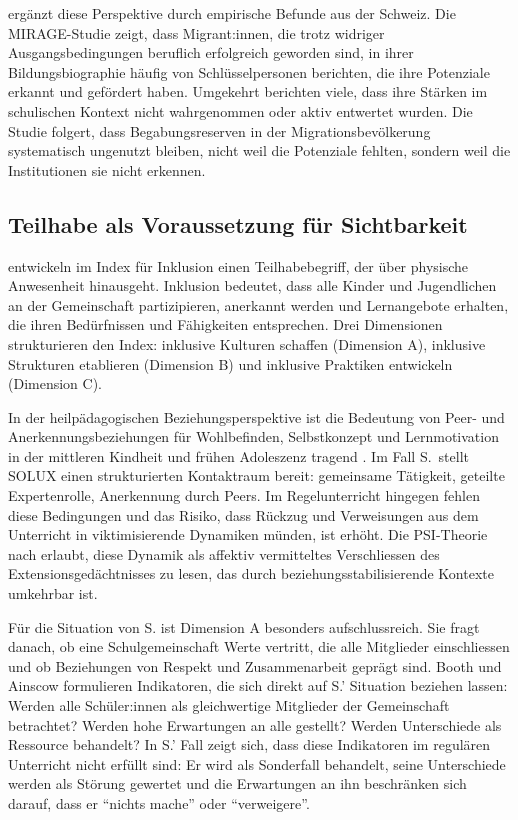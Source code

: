 \documentclass[ngerman, a4paper]{article}
\begin{document}
\textcite{stamm2014mirage} ergänzt diese Perspektive durch empirische Befunde aus der Schweiz. Die
MIRAGE-Studie zeigt, dass Migrant:innen, die trotz widriger Ausgangsbedingungen
beruflich erfolgreich geworden sind, in ihrer Bildungsbiographie häufig von
Schlüsselpersonen berichten, die ihre Potenziale erkannt und gefördert haben. Umgekehrt
berichten viele, dass ihre Stärken im schulischen Kontext nicht wahrgenommen
oder aktiv entwertet wurden. Die Studie folgert, dass Begabungsreserven in der
Migrationsbevölkerung systematisch ungenutzt bleiben, nicht weil die Potenziale
fehlten, sondern weil die Institutionen sie nicht erkennen.

\subsection{Teilhabe als Voraussetzung für Sichtbarkeit}

\textcite[Dim.\,A--C]{booth2019index} entwickeln im Index für Inklusion einen Teilhabebegriff, der über
physische Anwesenheit hinausgeht. Inklusion bedeutet, dass alle Kinder und Jugendlichen
an der Gemeinschaft partizipieren, anerkannt werden und Lernangebote erhalten, die
ihren Bedürfnissen und Fähigkeiten entsprechen. Drei Dimensionen strukturieren den
Index: inklusive Kulturen schaffen (Dimension A), inklusive Strukturen etablieren
(Dimension B) und inklusive Praktiken entwickeln (Dimension C).

In der heilpädagogischen Beziehungsperspektive ist die Bedeutung von Peer-
und Anerkennungsbeziehungen für Wohlbefinden, Selbstkonzept und
Lernmotivation in der mittleren Kindheit und frühen Adoleszenz tragend
\parencite[S.\,88,\,91]{grossrieder2010anerkennung}. Im Fall S.\ stellt SOLUX
einen strukturierten Kontaktraum bereit: gemeinsame Tätigkeit, geteilte
Expertenrolle, Anerkennung durch Peers. Im Regelunterricht hingegen fehlen
diese Bedingungen und das Risiko, dass Rückzug und Verweisungen aus dem
Unterricht in viktimisierende Dynamiken münden, ist erhöht. Die
PSI-Theorie nach \textcite[S.\,35--57]{kuhl2019diversitaet} erlaubt, diese
Dynamik als affektiv vermitteltes Verschliessen des Extensionsgedächtnisses
zu lesen, das durch beziehungsstabilisierende Kontexte umkehrbar ist.

Für die Situation von S. ist Dimension A besonders aufschlussreich. Sie fragt danach,
ob eine Schulgemeinschaft Werte vertritt, die alle Mitglieder einschliessen und ob
Beziehungen von Respekt und Zusammenarbeit geprägt sind. Booth und Ainscow
formulieren Indikatoren, die sich direkt auf S.' Situation beziehen lassen: Werden alle
Schüler:innen als gleichwertige Mitglieder der Gemeinschaft betrachtet? Werden hohe
Erwartungen an alle gestellt? Werden Unterschiede als Ressource behandelt? In S.' Fall
zeigt sich, dass diese Indikatoren im regulären Unterricht nicht erfüllt sind: Er wird
als Sonderfall behandelt, seine Unterschiede werden als Störung gewertet und die
Erwartungen an ihn beschränken sich darauf, dass er \enquote{nichts mache} oder
\enquote{verweigere}.
\end{document}
